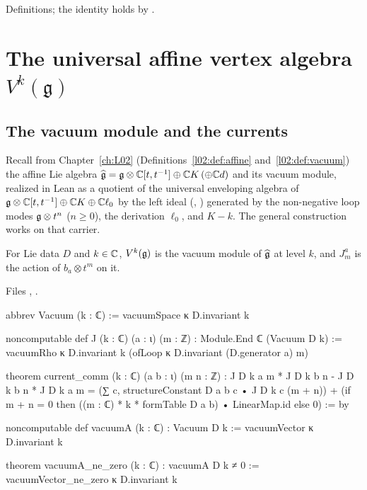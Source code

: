 \begin{status}
Definitions; the identity  holds by .
\end{status}

\section{The universal affine vertex algebra \texorpdfstring{$V^k(\mathfrak g)$}{V\^{}k(g)}}\label{l23:sec:universal}

\subsection{The vacuum module and the currents}

Recall from Chapter~\ref{ch:L02} (Definitions~\ref{l02:def:affine} and~\ref{l02:def:vacuum}) the affine Lie algebra
$\widehat{\mathfrak g}=\mathfrak g\otimes{\mathbb{C}}[t,t^{-1}]\oplus{\mathbb{C}} K\,(\oplus{\mathbb{C}} d)$ and its vacuum module, realized in Lean as a
quotient of the universal enveloping algebra of $\mathfrak g\otimes{\mathbb{C}}[t,t^{-1}]\oplus{\mathbb{C}} K\oplus{\mathbb{C}}\ell_0$ by the left ideal
(, ) generated by the non-negative loop modes
$\mathfrak g\otimes t^{n}$ ($n\ge0$), the derivation $\ell_0$, and $K-k$. The general construction works on that carrier.

\begin{definition}\label{l23:def:vacuum}
For Lie data $D$ and $k\in{\mathbb{C}}$, $V^k(\mathfrak g)$ is the vacuum module of $\widehat{\mathfrak g}$ at level $k$, and $J^a_m$ is the
action of $b_a\otimes t^m$ on it.
\end{definition}
\noindent Files ,
.
\begin{leancode}
abbrev Vacuum (k : ℂ) := vacuumSpace κ D.invariant k

noncomputable def J (k : ℂ) (a : ι) (m : ℤ) : Module.End ℂ (Vacuum D k) :=
  vacuumRho κ D.invariant k (ofLoop κ D.invariant (D.generator a) m)

theorem current_comm (k : ℂ) (a b : ι) (m n : ℤ) :
    J D k a m * J D k b n - J D k b n * J D k a m
      = (∑ c, structureConstant D a b c • J D k c (m + n))
        + (if m + n = 0 then ((m : ℂ) * k * formTable D a b) • LinearMap.id else 0) := by

noncomputable def vacuumA (k : ℂ) : Vacuum D k :=
  vacuumVector κ D.invariant k

theorem vacuumA_ne_zero (k : ℂ) : vacuumA D k ≠ 0 :=
  vacuumVector_ne_zero κ D.invariant k
\end{leancode}

